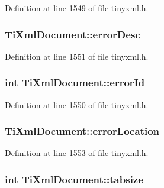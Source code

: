 Definition at line 1549 of file tinyxml.h.

\hypertarget{class_ti_xml_document_acdcc006167a6ba3bf8d8c7c1651cb03c}{
\subsubsection[{errorDesc}]{ {\bf TiXmlDocument::errorDesc}}}
\label{class_ti_xml_document_acdcc006167a6ba3bf8d8c7c1651cb03c}


Definition at line 1551 of file tinyxml.h.

\hypertarget{class_ti_xml_document_acdef97a4bb80729ac6863dd54cee7eeb}{
\subsubsection[{errorId}]{\setlength{\rightskip}{0pt plus 5cm}int {\bf TiXmlDocument::errorId}}}
\label{class_ti_xml_document_acdef97a4bb80729ac6863dd54cee7eeb}


Definition at line 1550 of file tinyxml.h.

\hypertarget{class_ti_xml_document_aa4030f989f1549f6b897147fc2851d1a}{
\subsubsection[{errorLocation}]{ {\bf TiXmlDocument::errorLocation}}}
\label{class_ti_xml_document_aa4030f989f1549f6b897147fc2851d1a}


Definition at line 1553 of file tinyxml.h.

\hypertarget{class_ti_xml_document_af2fa6a010b903d893d52cc6fee5575a1}{
\subsubsection[{tabsize}]{\setlength{\rightskip}{0pt plus 5cm}int {\bf TiXmlDocument::tabsize}}}
\label{class_ti_xml_document_af2fa6a010b903d893d52cc6fee5575a1}


